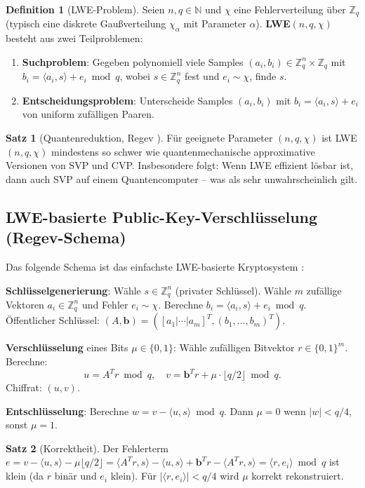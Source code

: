 ﻿\documentclass[a4paper,12pt]{scrreprt}
\theoremstyle{definition}
\newtheorem{definition}{Definition}[section]
\newtheorem{satz}{Satz}[section]
\begin{document}
\begin{definition}[LWE-Problem]
Seien $n, q \in \mathbb{N}$ und $\chi$ eine Fehlerverteilung über $\mathbb{Z}_q$ (typisch eine diskrete Gaußverteilung $\chi_\alpha$ mit Parameter $\alpha$). \textbf{LWE}$(n, q, \chi)$ besteht aus zwei Teilproblemen:
\begin{enumerate}
    \item \textbf{Suchproblem}: Gegeben polynomiell viele Samples $(a_i, b_i) \in \mathbb{Z}_q^n \times \mathbb{Z}_q$ mit $b_i = \langle a_i, s \rangle + e_i \bmod q$, wobei $s \in \mathbb{Z}_q^n$ fest und $e_i \sim \chi$, finde $s$.
    \item \textbf{Entscheidungsproblem}: Unterscheide Samples $(a_i, b_i)$ mit $b_i = \langle a_i, s \rangle + e_i$ von uniform zufälligen Paaren.
\end{enumerate}
\end{definition}

\begin{satz}[Quantenreduktion, Regev \cite{Reg05}]
Für geeignete Parameter $(n, q, \chi)$ ist LWE$(n,q,\chi)$ mindestens so schwer wie quantenmechanische approximative Versionen von SVP und CVP. Insbesondere folgt: Wenn LWE effizient lösbar ist, dann auch SVP auf einem Quantencomputer -- was als sehr unwahrscheinlich gilt.
\end{satz}

\subsection{LWE-basierte Public-Key-Verschlüsselung (Regev-Schema)}

Das folgende Schema ist das einfachste LWE-basierte Kryptosystem \cite{Reg05}:

\textbf{Schlüsselgenerierung}: Wähle $s \in \mathbb{Z}_q^n$ (privater Schlüssel). Wähle $m$ zufällige Vektoren $a_i \in \mathbb{Z}_q^n$ und Fehler $e_i \sim \chi$. Berechne $b_i = \langle a_i, s \rangle + e_i \bmod q$. Öffentlicher Schlüssel: $(A, \mathbf{b}) = ([a_1|\cdots|a_m]^T, (b_1,\ldots,b_m)^T)$.

\textbf{Verschlüsselung} eines Bits $\mu \in \{0,1\}$: Wähle zufälligen Bitvektor $r \in \{0,1\}^m$. Berechne:
\[
u = A^T r \bmod q, \quad v = \mathbf{b}^T r + \mu \cdot \lfloor q/2 \rfloor \bmod q.
\]
Chiffrat: $(u, v)$.

\textbf{Entschlüsselung}: Berechne $w = v - \langle u, s \rangle \bmod q$. Dann $\mu = 0$ wenn $|w| < q/4$, sonst $\mu = 1$.

\begin{satz}[Korrektheit]
Der Fehlerterm $e = v - \langle u, s\rangle - \mu\lfloor q/2\rfloor = \langle A^Tr, s\rangle - \langle u,s\rangle + \mathbf{b}^Tr - \langle A^Tr,s\rangle = \langle r, e_i\rangle \bmod q$ ist klein (da $r$ binär und $e_i$ klein). Für $|\langle r,e_i\rangle| < q/4$ wird $\mu$ korrekt rekonstruiert.
\end{satz}
\end{document}
